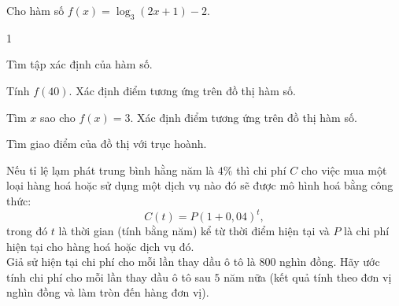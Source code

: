 \begin{bt}%
	Cho hàm số $f(x)=\log_3(2 x+1)-2$.
	\begin{enumEX}{1}
		\item Tìm tập xác định của hàm số.
		\item Tính $f(40)$. Xác định điểm tương ứng trên đồ thị hàm số.
		\item Tìm $x$ sao cho $f(x)=3$. Xác định điểm tương ứng trên đồ thị hàm số.
		\item Tìm giao điểm của đồ thị với trục hoành.
	\end{enumEX}
\end{bt}

\begin{bt}%
	Nếu tỉ lệ lạm phát trung bình hằng năm là $4 \%$ thì chi phí $C$ cho việc mua một loại hàng hoá hoặc sử dụng một dịch vụ nào đó sẽ được mô hình hoá bằng công thức:
	$$C(t)=P(1+0,04)^t,$$
	trong đó $t$ là thời gian (tính bằng năm) kể từ thời điểm hiện tại và $P$ là chi phí hiện tại cho hàng hoá hoặc dịch vụ đó.\\
	Giả sử hiện tại chi phí cho mỗi lần thay dầu ô tô là $ 800 $ nghìn đồng. Hãy ước tính chi phí cho mỗi lần thay dầu ô tô sau $ 5 $ năm nữa (kết quả tính theo đơn vị nghìn đồng và làm tròn đến hàng đơn vị).
\end{bt}

